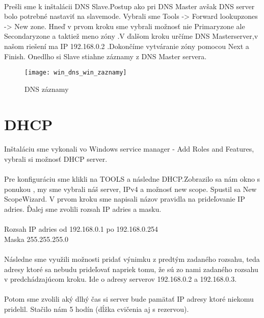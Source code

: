 \paragraph{}
Prešli sme k inštalácii DNS Slave.Postup ako pri DNS Master avšak  DNS server bolo potrebné nastaviť na slavemode. Vybrali sme  Tools -\textgreater{} Forward lookupzones -\textgreater{} New zone. Hneď v prvom kroku sme vybrali  možnosť nie Primaryzone ale Secondaryzone a taktiež  meno zóny .V ďalšom kroku určíme DNS Masterserver,v našom riešení ma  IP 192.168.0.2 .Dokončíme vytváranie zóny pomocou Next a Finish. Onedlho si Slave stiahne záznamy z DNS Master servera.

\begin{figure}[!htb]
\centering
\texttt{[image: win\_dns\_win\_zaznamy]}
\caption{DNS záznamy}
\label{fig:x win_dns}
\end{figure}

\section{DHCP}
\paragraph{}
Inštaláciu sme vykonali vo Windows service manager - Add Roles and Features, vybrali si možnosť DHCP server.
\paragraph{}
Pre konfiguráciu sme klikli na TOOLS a následne DHCP.Zobrazilo sa nám okno s ponukou , my sme vybrali náš server, IPv4 a možnosť new scope. Spustil sa New ScopeWizard. V prvom kroku  sme napisali názov pravidla na prideľovanie IP adries. Ďalej sme zvolili  rozsah IP adries a masku.
\\
\\
Rozsah IP adries od 192.168.0.1 po 192.168.0.254\\
Maska 255.255.255.0
\paragraph{}
Následne sme využili možnosti pridať výnimku z predtým zadaného rozsahu, teda adresy ktoré sa nebudu prideľovať napriek tomu, že sú zo nami  zadaného rozsahu v predchádzajúcom kroku. Ide o adresy serverov 192.168.0.2 a 192.168.0.3.
\paragraph{}
Potom  sme zvolili aký dlhý čas si server bude pamätať IP adresy ktoré niekomu pridelil. Stačilo nám 5 hodín (dĺžka cvičenia aj s rezervou).
